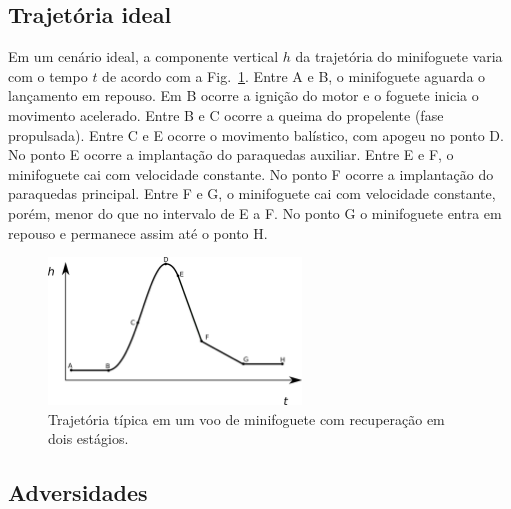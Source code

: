 \documentclass[12pt,a4paper]{article}
\begin{document}
\subsection{Trajetória ideal}
Em um cenário ideal, a componente vertical $h$ da trajetória do minifoguete varia com o tempo $t$ de acordo com a Fig.~\ref{fig:trajectoryA}. Entre A e B, o minifoguete aguarda o lançamento em repouso. Em B ocorre a ignição do motor e o foguete inicia o movimento acelerado. Entre B e C ocorre a queima do propelente (fase propulsada). Entre C e E ocorre o movimento balístico, com apogeu no ponto D. No ponto E ocorre a implantação do paraquedas auxiliar. Entre E e F, o minifoguete cai com velocidade constante. No ponto F ocorre a implantação do paraquedas principal. Entre F e G, o minifoguete cai com velocidade constante, porém, menor do que no intervalo de E a F. No ponto G o minifoguete entra em repouso e permanece assim até o ponto H. 
\begin{figure}[!ht]
	\centering
	\includegraphics[width=0.6\textwidth]{./fig/trajectoryA}
	\caption{Trajetória típica em um voo de minifoguete com recuperação em dois estágios.}
	\label{fig:trajectoryA}
\end{figure}

\subsection{Adversidades}
\label{sec:adversities}
\end{document}
